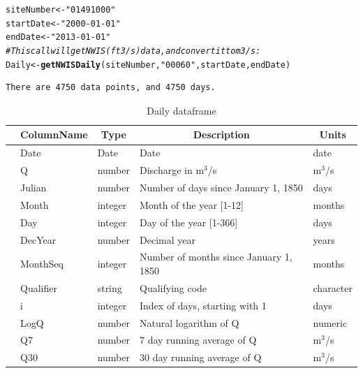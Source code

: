 \documentclass[a4paper,11pt]{article}\usepackage[]{graphicx}\usepackage[]{color}
\makeatletter
\newcommand{\hlstr}[1]{\textcolor[rgb]{0.192,0.494,0.8}{#1}}%
\newcommand{\hlcom}[1]{\textcolor[rgb]{0.678,0.584,0.686}{\textit{#1}}}%
\newcommand{\hlstd}[1]{\textcolor[rgb]{0.345,0.345,0.345}{#1}}%
\newcommand{\hlkwb}[1]{\textcolor[rgb]{0.69,0.353,0.396}{#1}}%
\newcommand{\hlkwd}[1]{\textcolor[rgb]{0.737,0.353,0.396}{\textbf{#1}}}%
\newenvironment{kframe}{%
 \def\at@end@of@kframe{}%
 \ifinner\ifhmode%
  \def\at@end@of@kframe{\end{minipage}}%
  \begin{minipage}{\columnwidth}%
 \fi\fi%
 \def\FrameCommand##1{\hskip\@totalleftmargin \hskip-\fboxsep
 \colorbox{shadecolor}{##1}\hskip-\fboxsep
     \hskip-\linewidth \hskip-\@totalleftmargin \hskip\columnwidth}%
 \MakeFramed {\advance\hsize-\width
   \@totalleftmargin\z@ \linewidth\hsize
   \@setminipage}}%
 {\par\unskip\endMakeFramed%
 \at@end@of@kframe}
\newenvironment{knitrout}{}{} %
\makeatother
\begin{document}
\begin{knitrout}
\color{fgcolor}\begin{kframe}
\begin{alltt}
\hlstd{siteNumber} \hlkwb{<-} \hlstr{"01491000"}
\hlstd{startDate} \hlkwb{<-} \hlstr{"2000-01-01"}
\hlstd{endDate} \hlkwb{<-} \hlstr{"2013-01-01"}
\hlcom{# This call will get NWIS (ft3/s) data , and convert it to m3/s:}
\hlstd{Daily} \hlkwb{<-} \hlkwd{getNWISDaily}\hlstd{(siteNumber,} \hlstr{"00060"}\hlstd{, startDate, endDate)}
\end{alltt}
\begin{verbatim}
There are 4750 data points, and 4750 days.
\end{verbatim}
\end{kframe}
\end{knitrout}



\begin{table}[ht]
\caption{Daily dataframe} 
\label{tab:DailyDF1}
{\footnotesize
\begin{tabular}{rllll}
  \hline
 & \multicolumn{1}{c}{\textbf{\textsf{ColumnName}}} & \multicolumn{1}{c}{\textbf{\textsf{Type}}} & \multicolumn{1}{c}{\textbf{\textsf{Description}}} & \multicolumn{1}{c}{\textbf{\textsf{Units}}} \\ 
  \hline
 & Date & Date & Date & date \\ 
  [5pt] & Q & number & Discharge in m$^3$/s & m$^3$/s \\ 
  [5pt] & Julian & number & Number of days since January 1, 1850 & days \\ 
  [5pt] & Month & integer & Month of the year [1-12] & months \\ 
  [5pt] & Day & integer & Day of the year [1-366] & days \\ 
  [5pt] & DecYear & number & Decimal year & years \\ 
  [5pt] & MonthSeq & integer & Number of months since January 1, 1850 & months \\ 
  [5pt] & Qualifier & string & Qualifying code & character \\ 
  [5pt] & i & integer & Index of days, starting with 1 & days \\ 
  [5pt] & LogQ & number & Natural logarithm of Q & numeric \\ 
  [5pt] & Q7 & number & 7 day running average of Q & m$^3$/s \\ 
  [5pt] & Q30 & number & 30 day running average of Q & m$^3$/s \\ 
   \hline
\end{tabular}
}
\end{table}
\end{document}
